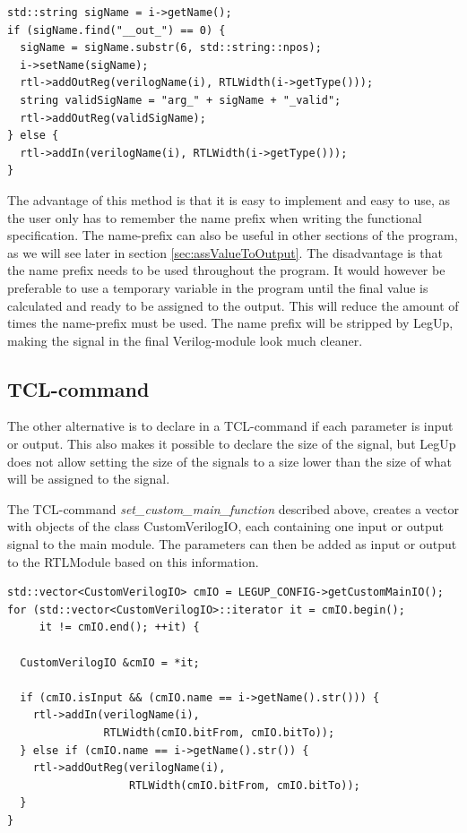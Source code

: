 \begin{lstlisting}
std::string sigName = i->getName();
if (sigName.find("__out_") == 0) {
  sigName = sigName.substr(6, std::string::npos);
  i->setName(sigName);
  rtl->addOutReg(verilogName(i), RTLWidth(i->getType()));
  string validSigName = "arg_" + sigName + "_valid";
  rtl->addOutReg(validSigName);
} else {
  rtl->addIn(verilogName(i), RTLWidth(i->getType())); 
}
\end{lstlisting}
The advantage of this method is that it is easy to implement and easy to use, as the user only has to remember the name prefix when writing the functional specification. The name-prefix can also be useful in other sections of the program, as we will see later in section \ref{sec:assValueToOutput}. The disadvantage is that the name prefix needs to be used throughout the program. It would however be preferable to use a temporary variable in the program until the final value is calculated and ready to be assigned to the output. This will reduce the amount of times the name-prefix must be used.
The name prefix will be stripped by LegUp, making the signal in the final Verilog-module look much cleaner.
\subsection{\label{subsubsec:inoutparameter}TCL-command}
The other alternative is to declare in a TCL-command if each parameter is input or output. This also makes it possible to declare the size of the signal, but LegUp does not allow setting the size of the signals to a size lower than the size of what will be assigned to the signal.

The TCL-command \textit{set\_custom\_main\_function} described above, creates a vector with objects of the class CustomVerilogIO, each containing one input or output signal to the main module. The parameters can then be added as input or output to the RTLModule based on this information.
\begin{lstlisting}
std::vector<CustomVerilogIO> cmIO = LEGUP_CONFIG->getCustomMainIO();
for (std::vector<CustomVerilogIO>::iterator it = cmIO.begin();
     it != cmIO.end(); ++it) {

  CustomVerilogIO &cmIO = *it;

  if (cmIO.isInput && (cmIO.name == i->getName().str())) {
    rtl->addIn(verilogName(i),
               RTLWidth(cmIO.bitFrom, cmIO.bitTo));
  } else if (cmIO.name == i->getName().str()) {
    rtl->addOutReg(verilogName(i),
                   RTLWidth(cmIO.bitFrom, cmIO.bitTo));
  }
}
\end{lstlisting}

